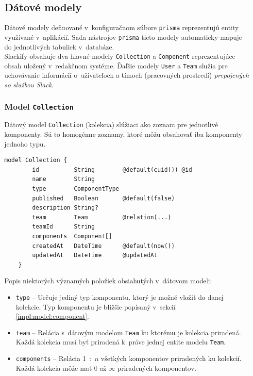 \subsection{Dátové modely}
\label{impl:data_models}
Dátové modely definované v~konfiguračnom súbore \texttt{prisma} reprezentujú entity využívané v~aplikácií. Sada nástrojov \texttt{prisma} tieto modely automaticky mapuje do jednotlivých tabuliek v~databáze. \\

\noindent Slackify obsahuje dva hlavné modely \texttt{Collection} a \texttt{Component} reprezentujúce obsah uložený v~redakčnom systéme. Ďaľšie modely \texttt{User} a \texttt{Team} služia pre uchovávanie informácií o~užívateľoch a tímoch (pracovných prostredí) \emph{prepojených so službou Slack}.

\subsubsection{Model \texttt{Collection}}
Dátový model \texttt{Collection} (kolekcia) slúžiaci ako zoznam pre jednotlivé komponenty. Sú to homogénne zoznamy, ktoré môžu obsahovať iba komponenty jednoho typu. \\

\begin{lstlisting}[language={Prisma}, caption=Dátový model \texttt{Collection} v~konfiguračnom súbore \texttt{prisma}.]
	model Collection {
		id          String        @default(cuid()) @id
		name        String
		type        ComponentType
		published   Boolean       @default(false)
		description String?
		team        Team          @relation(...)
		teamId      String
		components  Component[]
		createdAt   DateTime      @default(now())
		updatedAt   DateTime      @updatedAt
	}
\end{lstlisting}

\medskip

\noindent Popis niektorých významých položiek obsiahutých v~dátovom modeli:

\begin{itemize}
	\item \texttt{type} -- Určuje jediný typ komponentu, ktorý je možné vložiť do danej kolekcie. Typ komponentu je bližšie popísaný v~sekcií \ref{impl:model:component}.
	\item \texttt{team} -- Relácia s~dátovým modelom \texttt{Team} ku ktorému je kolekcia priradená. Každá kolekcia musí byť priradená k~práve jednej entite modelu \texttt{Team}.
	\item \texttt{components} -- Relácia 1~:~$n$ všetkých komponentov priradených ku kolekcií. Každá kolekcia môže mať 0 až $\infty$ priradených komponentov.
\end{itemize}

